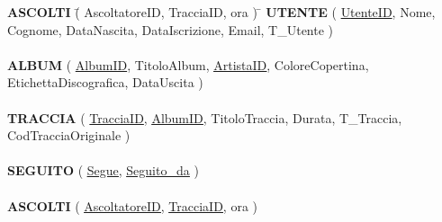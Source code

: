 \documentclass[11pt]{article}
\begin{document}
	\begin{tabbing}
		\textbf{ASCOLTI} \= ( AscoltatoreID, TracciaID, ora ) \= \kill
		\textbf{UTENTE} \> ( \underline{UtenteID}, Nome, Cognome, DataNascita, DataIscrizione, Email, T\_Utente )\\\\
		\textbf{ALBUM} \> ( \underline{AlbumID}, TitoloAlbum, \underline{\underline{ArtistaID}}, ColoreCopertina, EtichettaDiscografica, DataUscita ) \\\\
		\textbf{TRACCIA} \> ( \underline{TracciaID}, \underline{\underline{AlbumID}}, TitoloTraccia, Durata, T\_Traccia, CodTracciaOriginale ) \\\\
		\textbf{SEGUITO} \> ( \underline{\underline{Segue}}, \underline{\underline{Seguito\_da}} )\\\\
		\textbf{ASCOLTI} \> ( \underline{\underline{AscoltatoreID}}, \underline{\underline{TracciaID}}, ora )
	\end{tabbing}
	
\end{document}
